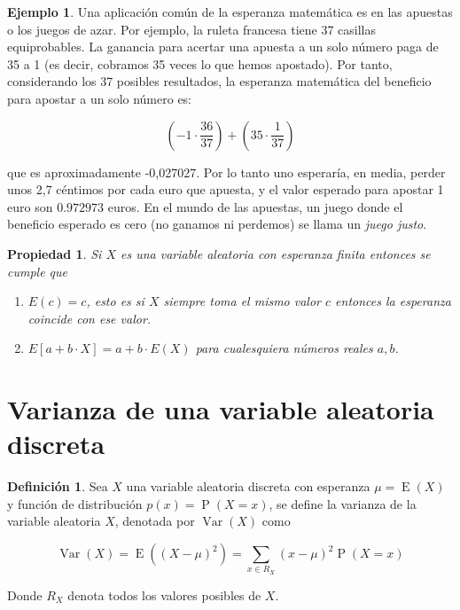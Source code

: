\documentclass[]{book}
\theoremstyle{plain}
\newtheorem{property}[theorem]{Propiedad}
\theoremstyle{definition}
\newtheorem{definition}[theorem]{Definición}
\newtheorem{example}[theorem]{Ejemplo}
\theoremstyle{definition} %
\begin{document}
\begin{example}
  
Una aplicación común de la esperanza matemática es en las apuestas o los
juegos de azar. Por ejemplo, la ruleta francesa tiene 37 casillas
equiprobables. La ganancia para acertar una apuesta a un solo número
paga de 35 a 1 (es decir, cobramos 35 veces lo que hemos apostado). Por
tanto, considerando los 37 posibles resultados, la esperanza matemática
del beneficio para apostar a un solo número es:

\[\displaystyle \left(-1\cdot {\frac {36}{37}}\right)+\left(35\cdot {\frac {1}{37}}\right)\]

que es aproximadamente -0,027027. Por lo tanto uno esperaría, en media,
perder unos 2,7 céntimos por cada euro que apuesta, y el valor esperado
para apostar 1 euro son \(0.972973\) euros. En el mundo de las apuestas,
un juego donde el beneficio esperado es cero (no ganamos ni perdemos) se
llama un \emph{juego justo}.
\end{example}


\begin{property}
  Si $X$ es una variable aleatoria con esperanza finita entonces se cumple que 
  \begin{enumerate}
    \item $E(c) = c$, esto es si $X$ siempre toma el mismo valor $c$ entonces la esperanza coincide con ese valor.
    \item $E[a + b \cdot X] = a + b \cdot E(X)$ para cualesquiera números reales $a,b$.
  \end{enumerate}
  
\end{property}

\section{Varianza de una variable aleatoria
discreta}
\begin{definition}
  Sea \(X\) una variable aleatoria discreta con esperanza
\(\displaystyle \mu =\operatorname {E} (X)\) y función de distribución \(p(x) = \displaystyle \operatorname {P} (X=x)\), se define la varianza de
la variable aleatoria \(X\), denotada por
\(\displaystyle \operatorname {Var} (X)\) como

\[\displaystyle \operatorname {Var} (X)=\operatorname {E} ((X-\mu )^{2}) = \sum _{x\in R_{X}}(x-\mu )^{2}\operatorname {P} (X=x)\]

Donde \(R_X\) denota todos los valores posibles de \(X\).
\end{definition}
\end{document}
